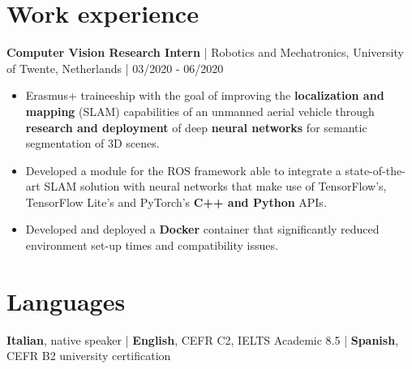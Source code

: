 \documentclass[10pt, a4paper]{extarticle}
\begin{document}
\section*{Work experience}
\textbf{Computer Vision Research Intern} | Robotics and Mechatronics, University of Twente, Netherlands | 03/2020 - 06/2020

\begin{itemize}
\item Erasmus+ traineeship with the goal of improving the \textbf{localization and mapping} (SLAM) capabilities of an unmanned aerial vehicle through \textbf{research and deployment} of deep \textbf{neural networks} for semantic segmentation of 3D scenes.
\item Developed a module for the ROS framework able to integrate a state-of-the-art SLAM solution with neural networks that make use of TensorFlow's, TensorFlow Lite's and PyTorch's \textbf{C++ and Python} APIs.
\item Developed and deployed a \textbf{Docker} container that significantly reduced environment set-up times and compatibility issues.
\end{itemize}

\section*{Languages}

\textbf{Italian}, native speaker | \textbf{English}, CEFR C2, IELTS Academic 8.5 | \textbf{Spanish}, CEFR B2 university certification
\end{document}
